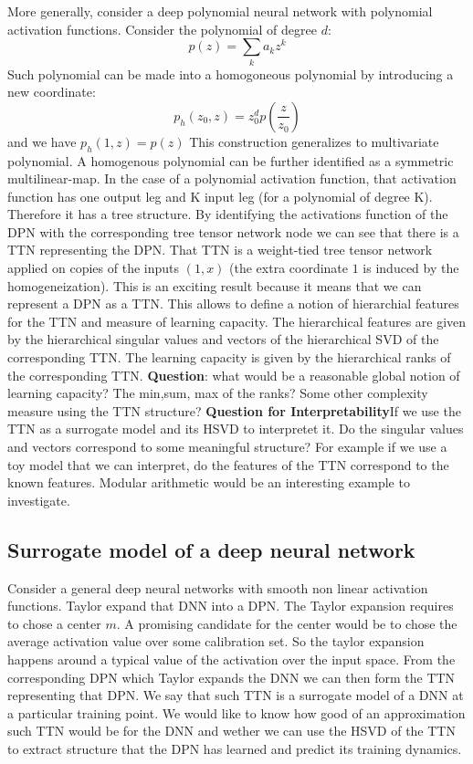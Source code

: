 \documentclass{article}
\theoremstyle{definition}
\begin{document}
More generally, consider a deep polynomial neural network with polynomial activation functions. Consider the polynomial of degree $d$:
\[
p(z) = \sum_k a_kz^k
\]
Such polynomial can be made into a homogoneous polynomial by introducing a new coordinate:
\[
p_h(z_0,z) = z_0^d p(\frac{z}{z_0})
\]
and we have $p_h(1,z) = p(z)$ This construction generalizes to multivariate polynomial. 
A homogenous polynomial can be further identified as a symmetric multilinear-map. In the case of a polynomial activation function, that activation function has one output leg and K input leg (for a polynomial of degree K). Therefore it has a tree structure. By identifying the activations function of the DPN with the corresponding tree tensor network node we can see that there is a TTN representing the DPN. That TTN is a weight-tied tree tensor network applied on copies of the inputs $(1,x)$ (the extra coordinate $1$ is induced by the homogeneization).
This is an exciting result because it means that we can represent a DPN as a TTN. This allows to define a notion of hierarchial features for the TTN and measure of learning capacity. The hierarchical features are given by the hierarchical singular values and vectors of the hierarchical SVD of the corresponding TTN. The learning capacity is given by the hierarchical ranks of the corresponding TTN. \textbf{Question}: what would be a reasonable global notion of learning capacity? The min,sum, max of the ranks? Some other complexity measure using the TTN structure?
\textbf{Question for Interpretability}If we use the TTN as a surrogate model and its HSVD to interpretet it. Do the singular values and vectors correspond to some meaningful structure? For example if we use a toy model that we can interpret, do the features of the TTN correspond to the known features. Modular arithmetic would be an interesting example to investigate.


\subsection{Surrogate model of a deep neural network}
Consider a general deep neural networks with smooth non linear activation functions. Taylor expand that DNN into a DPN. The Taylor expansion requires to chose a center $m$. A promising candidate for the center would be to chose the average activation value over some calibration set. So the taylor expansion happens around a typical value of the activation over the input space. From the corresponding DPN which Taylor expands the DNN we can then form the TTN representing that DPN. We say that such TTN is a surrogate model of a DNN at a particular training point. We would like to know how good of an approximation such TTN would be for the DNN and wether we can use the HSVD of the TTN to extract structure that the DPN has learned and predict its training dynamics.
\end{document}

